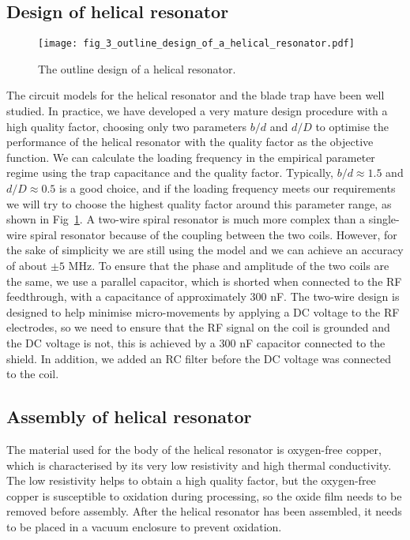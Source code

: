 \subsection{Design of helical resonator}

\begin{figure}
    \centering
    \texttt{[image: fig\_3\_outline\_design\_of\_a\_helical\_resonator.pdf]}
    \caption{The outline design of a helical resonator.}
    \label{fig:outline_design_of_a_helical_resonator}
\end{figure}

The circuit models for the helical resonator and the blade trap have been well studied. In practice, we have developed a very mature design procedure with a high quality factor, choosing only two parameters $ b / d $ and $ d / D $ to optimise the performance of the helical resonator with the quality factor as the objective function. We can calculate the loading frequency in the empirical parameter regime using the trap capacitance and the quality factor. Typically, $ b / d \approx 1.5 $ and $ d / D \approx 0.5 $ is a good choice, and if the loading frequency meets our requirements we will try to choose the highest quality factor around this parameter range, as shown in Fig~\ref{fig:outline_design_of_a_helical_resonator}. A two-wire spiral resonator is much more complex than a single-wire spiral resonator because of the coupling between the two coils. However, for the sake of simplicity we are still using the model and we can achieve an accuracy of about $\pm 5$ MHz. To ensure that the phase and amplitude of the two coils are the same, we use a parallel capacitor, which is shorted when connected to the RF feedthrough, with a capacitance of approximately 300 nF. The two-wire design is designed to help minimise micro-movements by applying a DC voltage to the RF electrodes, so we need to ensure that the RF signal on the coil is grounded and the DC voltage is not, this is achieved by a 300 nF capacitor connected to the shield. In addition, we added an RC filter before the DC voltage was connected to the coil.

\subsection{Assembly of helical resonator}

The material used for the body of the helical resonator is oxygen-free copper, which is characterised by its very low resistivity and high thermal conductivity. The low resistivity helps to obtain a high quality factor, but the oxygen-free copper is susceptible to oxidation during processing, so the oxide film needs to be removed before assembly. After the helical resonator has been assembled, it needs to be placed in a vacuum enclosure to prevent oxidation.

